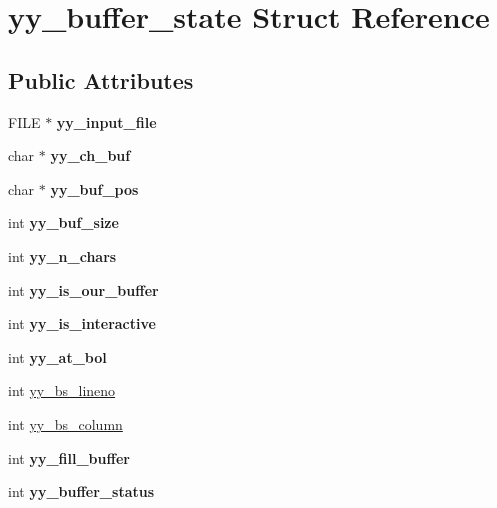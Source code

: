 \hypertarget{structyy__buffer__state}{}\section{yy\+\_\+buffer\+\_\+state Struct Reference}
\label{structyy__buffer__state}
\subsection*{Public Attributes}
\begin{DoxyCompactItemize}
\item 
\mbox{\label{structyy__buffer__state_a4360acfb226a1fc240ab2be17dd6beda}} 
F\+I\+LE $\ast$ {\bfseries yy\+\_\+input\+\_\+file}
\item 
\mbox{\label{structyy__buffer__state_a0d25458e69eb22207fc633a1255d099d}} 
char $\ast$ {\bfseries yy\+\_\+ch\+\_\+buf}
\item 
\mbox{\label{structyy__buffer__state_a8435c3f786bbb55d21d0174e4cfc22a0}} 
char $\ast$ {\bfseries yy\+\_\+buf\+\_\+pos}
\item 
\mbox{\label{structyy__buffer__state_a451d39697f006f3922c1f43cf79286b4}} 
int {\bfseries yy\+\_\+buf\+\_\+size}
\item 
\mbox{\label{structyy__buffer__state_a06406208824817acfec2183b79080945}} 
int {\bfseries yy\+\_\+n\+\_\+chars}
\item 
\mbox{\label{structyy__buffer__state_a80ce2431c70dc4f89ced487f18449465}} 
int {\bfseries yy\+\_\+is\+\_\+our\+\_\+buffer}
\item 
\mbox{\label{structyy__buffer__state_abf5c70eea75581b58c0ee7bd31b14490}} 
int {\bfseries yy\+\_\+is\+\_\+interactive}
\item 
\mbox{\label{structyy__buffer__state_a9d60c60af6e1a6f69de16871fd64f85f}} 
int {\bfseries yy\+\_\+at\+\_\+bol}
\item 
int \mbox{\hyperlink{structyy__buffer__state_a818e94bc9c766e683c60df1e9fd01199}{yy\+\_\+bs\+\_\+lineno}}
\item 
int \mbox{\hyperlink{structyy__buffer__state_a10c4fcd8be759e6bf11e6d3e8cdb0307}{yy\+\_\+bs\+\_\+column}}
\item 
\mbox{\label{structyy__buffer__state_a63d2afbb1d79a3fc63df9e12626f827d}} 
int {\bfseries yy\+\_\+fill\+\_\+buffer}
\item 
\mbox{\label{structyy__buffer__state_a70fd925d37a2f0454fbd0def675d106c}} 
int {\bfseries yy\+\_\+buffer\+\_\+status}
\end{DoxyCompactItemize}


